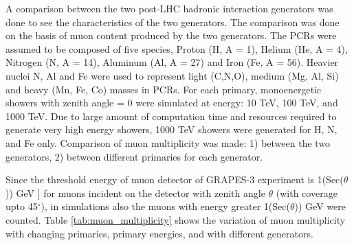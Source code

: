\documentclass[12pt]{article}
\begin{document}
A comparison between the two post-LHC hadronic interaction generators was done to see the characteristics of the two generators. The comparison was done on the basis of muon content produced by the two generators. The PCRs were assumed to be composed of five species\cite{tanaka}, Proton (H, A = 1), Helium (He, A = 4), Nitrogen (N, A = 14), Aluminum (Al, A = 27) and Iron (Fe, A = 56). Heavier nuclei N, Al and Fe were used to represent light (C,N,O), medium (Mg, Al, Si) and heavy (Mn, Fe, Co) masses in PCRs. For each primary, monoenergetic showers with zenith angle = 0 were simulated at energy: 10 TeV, 100 TeV, and 1000 TeV. Due to large amount of computation time and resources required to generate very high energy showers, 1000 TeV showers were generated for H, N, and Fe only. Comparison of muon multiplicity was made: 1) between the two generators, 2) between different primaries for each generator.

Since the threshold energy of muon detector of GRAPES-3 experiment is 1(Sec($\theta$)) GeV ]\cite{hayashi} for muons incident on the detector with zenith angle $\theta$ (with coverage upto 45$^\circ$), in simulations also the muons with energy greater 1(Sec($\theta$)) GeV were counted. Table \ref{tab:muon_multiplicity} shows the variation of muon multiplicity with changing primaries, primary energies, and with different generators. 
\end{document}
